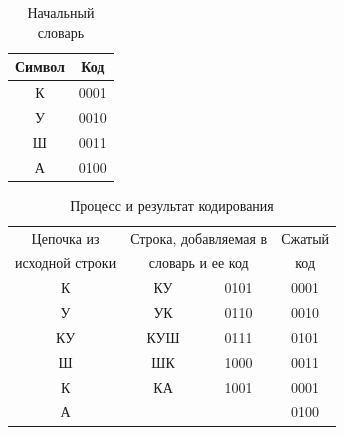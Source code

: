 \renewcommand{\arraystretch}{1.5}
\begin{table}[H]
\begin{center}
	\begin{tabular}{|c|c|}
		\hline	
		Символ & Код \\
		\hline
		  К    & 0001 \\
		\hline
		  У	   & 0010 \\
		\hline  
	  	  Ш	   & 0011 \\
		\hline  	
		  А    & 0100 \\
		\hline
	\end{tabular}
	\caption{Начальный словарь} 
	\label{table:lzw:dictionary}
\end{center}
\end{table}

\begin{table}[H]
\begin{center}
	\begin{tabular}{|c|c|c|c|}
		\hline	
		  Цепочка из & \multicolumn{2}{|c|}{Строка, добавляемая в} & Сжатый \\
		  исходной строки & \multicolumn{2}{|c|}{словарь и ее код} & код \\
		\hline
	  	  К    & КУ & 0101 & 0001 \\
		\hline
		  У	   & УК & 0110 & 0010 \\
		\hline  
		  КУ   & КУШ & 0111 & 0101 \\
		\hline  	
		  Ш    & ШК & 1000 & 0011 \\
		\hline
		  К    & КА & 1001 & 0001 \\
		\hline
		  А    &    &      & 0100 \\
		\hline
	\end{tabular}
	\caption{Процесс и результат кодирования}
	\label{table:lzw:result}
\end{center}
\end{table}


